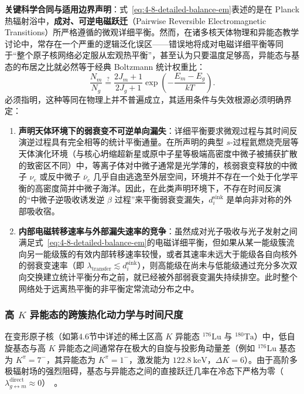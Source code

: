 \textbf{关键科学合同与适用边界声明}：式~\eqref{eq:4-8-detailed-balance-em}表述的是在 Planck 热辐射浴中，\textbf{成对、可逆电磁跃迁}（Pairwise Reversible Electromagnetic Transitions）所严格遵循的微观详细平衡。然而，在诸多核天体物理和异能态教学讨论中，常存在一个严重的逻辑泛化误区——错误地将成对电磁详细平衡等同于“整个原子核网络必定服从宏观热平衡”，甚至认为只要温度足够高，异能态与基态的布居之比就必然等于经典 Boltzmann 统计权重比：
\begin{equation}\label{eq:4-8-boltzmann-naive}
\frac{N_m}{N_g} \stackrel{?}{=} \frac{2J_m + 1}{2J_g + 1} \exp\left(-\frac{E_m - E_g}{kT}\right).
\end{equation}
必须指明，这种等同在物理上并不普遍成立，其适用条件与失效根源必须明确界定：
\begin{enumerate}
\item \textbf{声明天体环境下的弱衰变不可逆单向漏失}：详细平衡要求微观过程与其时间反演逆过程具有完全相等的统计平衡通量。在所声明的典型 $s$-过程氦燃烧壳层等天体演化环境（与核心坍缩超新星或原中子星等极端高密度中微子被捕获扩散的致密区不同）中，等离子体对中微子通常是光学薄的，核弱衰变释放的中微子 $\nu_e$ 或反中微子 $\bar{\nu}_e$ 几乎自由逃逸至外层空间，环境并不存在一个处于化学平衡的高密度简并中微子海洋。因此，在此类声明环境下，不存在时间反演的“中微子逆吸收诱发逆 $\beta$ 过程”来平衡弱衰变漏失，$d_i^{\mathrm{sink}}$ 是单向非对称的外部吸收宿。
\item \textbf{内部电磁转移速率与外部漏失速率的竞争}：虽然成对光子吸收与光子发射之间满足式~\eqref{eq:4-8-detailed-balance-em}的电磁详细平衡，但如果从某一能级簇流向另一能级簇的有效内部转移速率较慢，或者其速率未远大于能级各自向核外的弱衰变速率（即 $\lambda_{\mathrm{transfer}} \lesssim d_i^{\mathrm{sink}}$），则高能级在尚未与低能级通过充分多次双向交换建立统计平衡分布之前，就已经被外部弱衰变漏失持续排空。此时整个网络处于远离热平衡的非平衡定常流动分布之中。
\end{enumerate}

\subsubsection{高 $K$ 异能态的跨簇热化动力学与时间尺度}

在变形原子核（如第4.6节中详述的稀土区高 $K$ 异能态 $^{176}\mathrm{Lu}$ 与 $^{180}\mathrm{Ta}$）中，低自旋基态与高 $K$ 异能态之间通常存在极大的自旋与投影角动量差（例如 $^{176}\mathrm{Lu}$ 基态为 $K^\pi = 7^-$，其异能态为 $K^\pi = 1^-$，激发能为 $122.8\ \mathrm{keV}$，$\Delta K = 6$）。由于高阶多极辐射场的强烈阻碍，基态与异能态之间的直接跃迁几率在冷态下严格为零（$\lambda_{g \leftrightarrow m}^{\mathrm{direct}} \approx 0$）~\cite{gintautas-2009-176lu-thermal-equilibration}。

